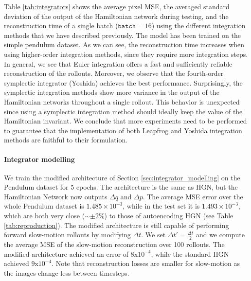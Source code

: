 Table \ref{tab:integrators} shows the average pixel MSE, the averaged standard deviation of the output of the Hamiltonian network during testing, and the reconstruction time of a single batch ($\texttt{batch}=16$) using the different integration methods that we have described previously. The model has been trained on the simple pendulum dataset. As we can see, the reconstruction time increases when using higher-order integration methods, since they require more integration steps. In general, we see that Euler integration offers a fast and sufficiently reliable reconstruction of the rollouts. Moreover, we observe that the fourth-order symplectic integrator (Yoshida) achieves the best performance. Surprisingly, the symplectic integration methods show more variance in the output of the Hamiltonian networks throughout a single rollout. This behavior is unexpected since using a symplectic integration method should ideally keep the value of the Hamiltonian invariant. We conclude that more experiments need to be performed to guarantee that the implementation of both Leapfrog and Yoshida integration methods are faithful to their formulation.


\paragraph{Integrator modelling} We train the modified architecture of Section \ref{sec:integrator_modelling} on the Pendulum dataset for 5 epochs. The architecture is the same as HGN, but the Hamiltonian Network now outputs $\Delta q$ and $\Delta p$. The average MSE error over the whole Pendulum dataset is $1.485\times 10^{-3}$, while in the test set it is $1.493 \times 10^{-3}$, which are both very close ($\sim \pm 2\%$) to those of autoencoding HGN (see Table \ref{tab:reproduction}). The modified architecture is still capable of performing forward slow-motion rollouts by modifying $\Delta t$. We set $\Delta t' = \frac{\Delta t}{2}$ and we compute the average MSE of the slow-motion reconstruction over 100 rollouts. The modified architecture achieved an error of $8$x$10^{-4}$, while the standard HGN achieved $9$x$10^{-4}$. Note that reconstruction losses are smaller for slow-motion as the images change less between timesteps.



